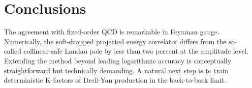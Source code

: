\section{Conclusions}\label{sec:conclusions}

The agreement with fixed-order QCD is remarkable in Feynman gauge.
Numerically, the soft-dropped projected energy correlator differs from
the so-called collinear-safe Landau pole by less than two percent at the
amplitude level. Extending the method beyond leading logarithmic
accuracy is conceptually straightforward but technically demanding. A
natural next step is to train deterministic K-factors of Drell-Yan
production in the back-to-back limit.

